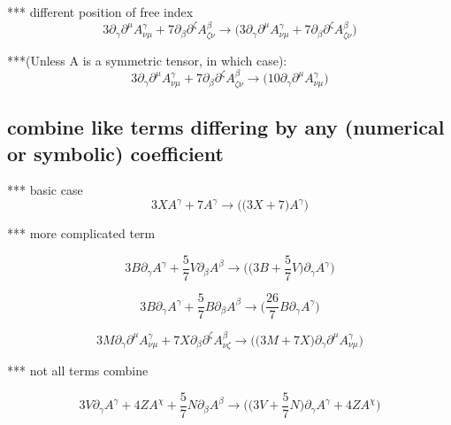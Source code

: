 \documentclass{article}
\def\){\Big)}
\def\({\Big(}
\begin{document}
{*** different position of free index
\begin{equation}
3\partial_{\gamma}\partial^{\mu}A^{\gamma}_{\nu \mu} + 7 \partial_{\beta}\partial^{\zeta}A^{\beta}_{\zeta \nu} \rightarrow 
\(3 \partial_{\gamma}\partial^{\mu}A_{\nu \mu}^{\gamma} +7 \partial_{\beta}\partial^{\zeta}A_{\zeta \nu}^{\beta} \)
\end{equation}

***(Unless A is a symmetric tensor, in which case):
\begin{equation}
3\partial_{\gamma}\partial^{\mu}A^{\gamma}_{\nu \mu} + 7 \partial_{\beta}\partial^{\zeta}A^{\beta}_{\zeta \nu} \rightarrow 
\(10 \partial_{\gamma}\partial^{\mu}A_{\nu \mu}^{\gamma} \)
\end{equation}



\subsection{ combine like terms differing by any (numerical or symbolic) coefficient}


*** basic case
\begin{equation}
3XA^{\gamma} + 7 A^{\gamma} \rightarrow 
\(\(3X+7\) A^{\gamma} \)
\end{equation}

*** more complicated term

\begin{equation}
3B \partial_{\gamma}A^{\gamma} + \frac{5}{7} V \partial_{\beta}A^{\beta} \rightarrow 
\(\(3B+\frac{5}{7}V\) \partial_{\gamma}A^{\gamma} \)
\end{equation}

\begin{equation}
3B \partial_{\gamma}A^{\gamma} + \frac{5}{7} B \partial_{\beta}A^{\beta} \rightarrow 
\(\frac{26}{7}B \partial_{\gamma}A^{\gamma} \)
\end{equation}

\begin{equation}
3M\partial_{\gamma}\partial^{\mu}A^{\gamma}_{\nu \mu} + 7X \partial_{\beta}\partial^{\zeta}A^{\beta}_{\nu \zeta} \rightarrow 
\(\(3M+7X\) \partial_{\gamma}\partial^{\mu}A_{\nu \mu}^{\gamma} \)
\end{equation}

*** not all terms combine 

\begin{equation}
3V\partial_{\gamma}A^{\gamma} + 4 ZA^{\chi}+ \frac{5}{7} N \partial_{\beta}A^{\beta} \rightarrow 
\(\(3V+\frac{5}{7}N\) \partial_{\gamma}A^{\gamma} +4Z A^{\chi} \)
\end{equation}

}
\end{document}
